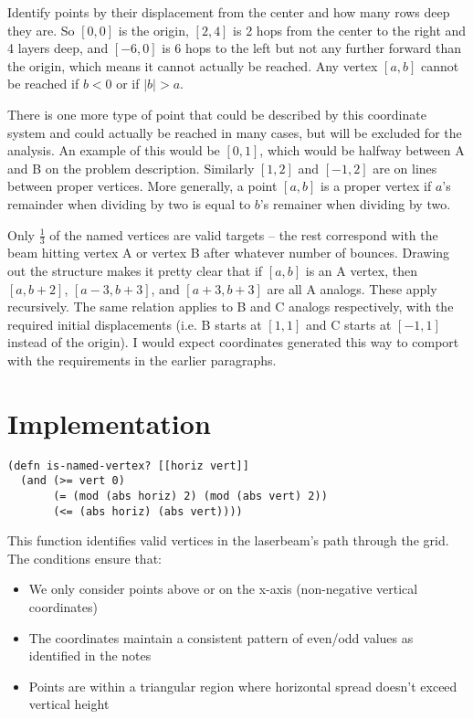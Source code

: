 \documentclass{article}
\begin{document}
\par

Identify points by their displacement from the center and how many rows deep they are.  So $[0, 0]$ is the origin, $[2, 4]$ is 2 hops from the center to the right and 4 layers deep, and $[-6, 0]$ is 6 hops to the left but not any further forward than the origin, which means it cannot actually be reached.  Any vertex $[a, b]$ cannot be reached if $b < 0$ or if $|b| > a$.

\par

There is one more type of point that could be described by this coordinate system and could actually be reached in many cases, but will be excluded for the analysis.  An example of this would be $[0, 1]$, which would be halfway between A and B on the problem description.  Similarly $[1, 2]$ and $[-1, 2]$ are on lines between proper vertices.  More generally, a point $[a, b]$ is a proper vertex if $a$'s remainder when dividing by two is equal to $b$'s remainer when dividing by two.

\par

Only ${\frac{1}{3}}$ of the named vertices are valid targets -- the rest correspond with the beam hitting vertex A or vertex B after whatever number of bounces.  Drawing out the structure makes it pretty clear that if $[a, b]$ is an A vertex, then $[a, b + 2]$, $[a - 3, b + 3]$, and $[a + 3, b + 3]$ are all A analogs.  These apply recursively.  The same relation applies to B and C analogs respectively, with the required initial displacements (i.e. B starts at $[1, 1]$ and C starts at $[-1, 1]$ instead of the origin).  I would expect coordinates generated this way to comport with the requirements in the earlier paragraphs.

\section*{Implementation}
\begin{lstlisting}
(defn is-named-vertex? [[horiz vert]]
  (and (>= vert 0)
       (= (mod (abs horiz) 2) (mod (abs vert) 2))
       (<= (abs horiz) (abs vert))))
\end{lstlisting}

This function identifies valid vertices in the laserbeam's path through the grid. The conditions ensure that:
\begin{itemize}
    \item We only consider points above or on the x-axis (non-negative vertical coordinates)
    \item The coordinates maintain a consistent pattern of even/odd values as identified in the notes
    \item Points are within a triangular region where horizontal spread doesn't exceed vertical height
\end{itemize}


\end{document}
